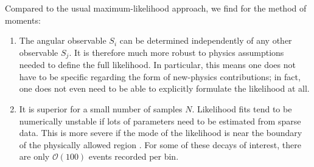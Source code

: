 \documentclass[aps,prd,reprint,nofootinbib,preprintnumbers]{revtex4}
\newcommand{\order}[1]{\mathcal{O}\left({#1}\right)}
\begin{document}
Compared to the usual maximum-likelihood approach, we find for the method of moments:
\begin{enumerate}
  \item The angular observable ${S_i}$ can be determined
  independently of any other observable ${S_j}$. It is therefore
  much more robust to physics assumptions needed to define the full
  likelihood. In particular, this means one does not have to be
  specific regarding the form of new-physics contributions; in fact,
  one does not even need to be able to explicitly formulate the
  likelihood at all.
\item It is superior for a small number of samples $N$. Likelihood
  fits tend to be numerically unstable if lots of parameters need to
  be estimated from sparse data. This is more severe if the mode of
  the likelihood is near the boundary of the physically allowed
  region \cite{lehmann1998}. For some of these decays of interest, there are only $\order{100}$ events
  recorded per bin.


\end{enumerate}
\end{document}
